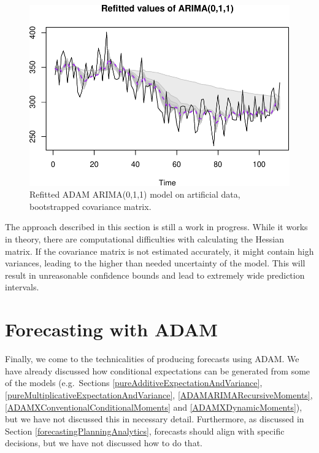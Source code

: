 \documentclass[
]{book}
\theoremstyle{definition}
\theoremstyle{definition}
\theoremstyle{definition}
\theoremstyle{definition}
\theoremstyle{remark}
\begin{document}
\begin{figure}
\centering
\includegraphics{Svetunkov--2022----ADAM_files/figure-latex/adamARIMARefitted200-1.pdf}
\caption{\label{fig:adamARIMARefitted200}Refitted ADAM ARIMA(0,1,1) model on artificial data, bootstrapped covariance matrix.}
\end{figure}

The approach described in this section is still a work in progress. While it works in theory, there are computational difficulties with calculating the Hessian matrix. If the covariance matrix is not estimated accurately, it might contain high variances, leading to the higher than needed uncertainty of the model. This will result in unreasonable confidence bounds and lead to extremely wide prediction intervals.

\hypertarget{ADAMForecasting}{%
\chapter{Forecasting with ADAM}\label{ADAMForecasting}}

Finally, we come to the technicalities of producing forecasts using ADAM. We have already discussed how conditional expectations can be generated from some of the models (e.g.~Sections \ref{pureAdditiveExpectationAndVariance}, \ref{pureMultiplicativeExpectationAndVariance}, \ref{ADAMARIMARecursiveMoments}, \ref{ADAMXConventionalConditionalMoments} and \ref{ADAMXDynamicMoments}), but we have not discussed this in necessary detail. Furthermore, as discussed in Section \ref{forecastingPlanningAnalytics}, forecasts should align with specific decisions, but we have not discussed how to do that.
\end{document}
